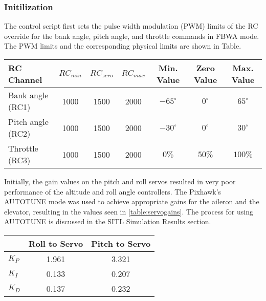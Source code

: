 \documentclass{aiaa}
\begin{document}

\subsubsection{Initilization}


The control script first sets the pulse width modulation (PWM) limits of the RC override for the bank angle, pitch angle, and throttle commands in FBWA mode. The PWM limits and the corresponding physical limits are shown in Table.

\begin{center}
\begin{tabular}{ l| c | c | c | c| c | c}
	
     RC Channel & $RC_{min}$ & $RC_{zero}$ & $RC_{max}$ & Min. Value & Zero Value & Max. Value \\
    \hline \hline
    Bank angle (RC1) & 1000 & 1500 & 2000 & $-65^{\circ}$ & $0^{\circ}$ & $65^{\circ}$\\
    \hline
    
    Pitch angle (RC2) & 1000 & 1500 & 2000 & $-30^{\circ}$ & $0^{\circ}$ & $30^{\circ}$\\
    \hline
    
    Throttle (RC3) & 1000 & 1500 & 2000 & $0\%$ & $50\%$ & $100\%$ \\
    \hline


\end{tabular}
\end{center}

Initially, the gain values on the pitch and roll servos resulted in very poor performance of the altitude and roll angle controllers. The Pixhawk's AUTOTUNE mode was used to achieve appropriate gains for the aileron and the elevator, resulting in the values seen in \ref{table:servogains}. The process for using AUTOTUNE is discussed in the SITL Simulation Results section.

\begin{center}
\begin{tabular}{ l| c | c }
\label{table:servogains}
	
      & Roll to Servo & Pitch to Servo \\
    \hline \hline
    $K_P$ & 1.961 & 3.321\\
    \hline
    
    $K_I$ & 0.133 & 0.207 \\
    \hline
    
    $K_D$ & 0.137 & 0.232 \\
    \hline


\end{tabular}
\end{center}
\end{document}
